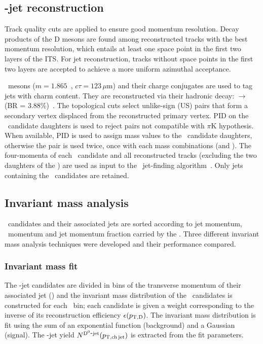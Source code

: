 \documentclass[a4paper]{jpconf}
\begin{document}
\subsection{\Dzero-jet reconstruction}
Track quality cuts are applied to ensure good momentum resolution. 
Decay products of the D mesons are found among reconstructed tracks with the best momentum resolution, which entails at least one space
point in the first two layers of the ITS.
For jet reconstruction, tracks without space points in the first two layers are accepted to achieve a more uniform azimuthal acceptance.

\Dzero\ mesons ($m=1.865$~\GeVcsq, $c\tau=123\,\mu$m) and their charge conjugates are used to tag jets with charm content.
They are reconstructed via their hadronic decay: \Dzero $\rightarrow$ \pip \kam (BR = 3.88\%)~\cite{PDG:2014}. 
The topological cuts select unlike-sign (US) pairs that form a secondary vertex displaced from the reconstructed
primary vertex. PID on the \Dzero\ candidate daughters is used to reject pairs not compatible with $\pi$K hypothesis.
When available, PID is used to assign mass values to the \Dzero\ candidate daughters, otherwise
the pair is used twice, once with each mass combinations (\pip \kam and \pim \kap). 
The four-momenta of each \Dzero\ candidate and all reconstructed tracks
(excluding the two daughters of the \Dzero) are used as input to the \antikt\ jet-finding algorithm~\cite{Cacciari:2008c}.
Only jets containing the \Dzero\ candidates are retained.

\subsection{Invariant mass analysis}
\Dzero\ candidates and their associated jets are sorted according to jet momentum, \Dzero\ momentum and jet momentum
fraction carried by the \Dzero.
Three different invariant mass analysis techniques were developed and their performance compared.

\subsubsection*{Invariant mass fit}
The \Dzero-jet candidates are divided in bins of the transverse momentum of their associated jet (\ptchjet) and the invariant mass distribution of the \Dzero\ candidates is constructed for each \ptchjet\ bin;
each candidate is given a weight corresponding to the inverse of its reconstruction efficiency $\epsilon(p_{\mathrm{T,D}})$.
The invariant mass distribution is fit using the sum of an exponential function (background) and a Gaussian (signal). 
The \Dzero-jet yield $N^{\rm \mathrm{D^{0}}\hbox{-}jet}(p_{\mathrm{T,ch\, jet}})$ is extracted from
the fit parameters.
\end{document}
